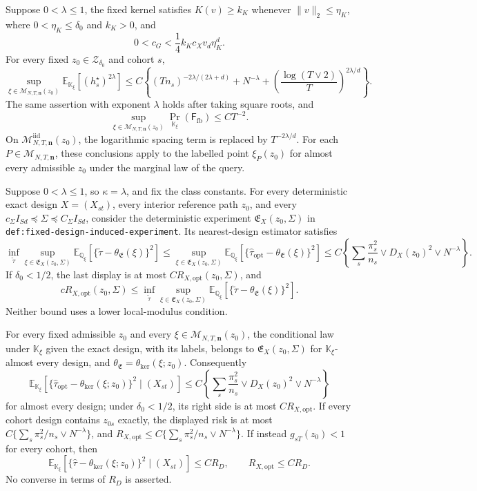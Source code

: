 Suppose \(0<\lambda\le1\), the fixed kernel satisfies
\(K(v)\ge k_K\) whenever \(\|v\|_2\le\eta_K\), where
\(0<\eta_K\le\delta_0\) and \(k_K>0\), and
\[
 0<c_G<\frac14 k_Kc_Xv_d\eta_K^d.
\]
For every fixed \(z_0\in\mathcal Z_{\delta_0}\) and cohort \(s\),
\[
 \sup_{\xi\in\mathcal M_{N,T,\mathbf n}(z_0)}
 \mathbb E_{\mathbb K_\xi}[(h_s^\star)^{2\lambda}]
 \le C\left\{(Tn_s)^{-2\lambda/(2\lambda+d)}+N^{-\lambda}
 +\left(\frac{\log(T\vee2)}{T}\right)^{2\lambda/d}\right\}.
\]
The same assertion with exponent \(\lambda\) holds after taking square
roots, and
\[
 \sup_{\xi\in\mathcal M_{N,T,\mathbf n}(z_0)}
 \Pr_{\mathbb K_\xi}(\mathsf F_{\mathrm{fb}})\le CT^{-2}.
\]
On \(\mathcal M^{\mathrm{iid}}_{N,T,\mathbf n}(z_0)\), the logarithmic
spacing term is replaced by \(T^{-2\lambda/d}\).  For each
\(P\in\mathcal M_{N,T,\mathbf n}\), these conclusions apply to the labelled
point \(\xi_P(z_0)\) for almost every admissible \(z_0\) under the marginal
law of the query.

Suppose \(0<\lambda\le1\), so \(\kappa=\lambda\), and fix the class
constants.  For every deterministic exact design \(X=(X_{st})\), every
interior reference path \(z_0\), and every
\(c_\Sigma I_{Sd}\preceq\Sigma\preceq C_\Sigma I_{Sd}\), consider the
deterministic experiment \(\mathfrak E_X(z_0,\Sigma)\) in
\texttt{def:fixed-design-induced-experiment}.  Its nearest-design estimator
satisfies
\[
 \inf_{\widetilde\tau}\sup_{\xi\in\mathfrak E_X(z_0,\Sigma)}
 \mathbb E_{\mathbb Q_\xi}
 \left[\{\widetilde\tau-\theta_{\mathfrak E}(\xi)\}^2\right]
 \le
 \sup_{\xi\in\mathfrak E_X(z_0,\Sigma)}
 \mathbb E_{\mathbb Q_\xi}
 \left[\{\widehat\tau_{\mathrm{opt}}-\theta_{\mathfrak E}(\xi)\}^2\right]
 \le C\left\{\sum_s\frac{\pi_s^2}{n_s}
          \vee D_X(z_0)^2\vee N^{-\lambda}\right\}.
\]
If \(\delta_0<1/2\), the last display is at most
\(CR_{X,\mathrm{opt}}(z_0,\Sigma)\), and
\[
 cR_{X,\mathrm{opt}}(z_0,\Sigma)
 \le
 \inf_{\widetilde\tau}\sup_{\xi\in\mathfrak E_X(z_0,\Sigma)}
 \mathbb E_{\mathbb Q_\xi}
 \left[\{\widetilde\tau-\theta_{\mathfrak E}(\xi)\}^2\right].
\]
Neither bound uses a lower local-modulus condition.

For every fixed admissible \(z_0\) and every
\(\xi\in\mathcal M_{N,T,\mathbf n}(z_0)\), the conditional law under
\(\mathbb K_\xi\) given the exact design, with its labels, belongs to
\(\mathfrak E_X(z_0,\Sigma)\) for \(\mathbb K_\xi\)-almost every design,
and \(\theta_{\mathfrak E}=\theta_{\mathrm{ker}}(\xi;z_0)\).  Consequently
\[
 \mathbb E_{\mathbb K_\xi}
 \left[\{\widehat\tau_{\mathrm{opt}}
 -\theta_{\mathrm{ker}}(\xi;z_0)\}^2\mid(X_{st})\right]
 \le C\left\{\sum_s\frac{\pi_s^2}{n_s}
          \vee D_X(z_0)^2\vee N^{-\lambda}\right\}
\]
for almost every design; under \(\delta_0<1/2\), its right side is at most
\(CR_{X,\mathrm{opt}}\).  If every cohort design contains \(z_{0s}\)
exactly, the displayed risk is at most
\(C\{\sum_s\pi_s^2/n_s\vee N^{-\lambda}\}\), and
\(R_{X,\mathrm{opt}}\le C\{\sum_s\pi_s^2/n_s\vee N^{-\lambda}\}\).
If instead \(g_{sT}(z_0)<1\) for every cohort, then
\[
 \mathbb E_{\mathbb K_\xi}
 \left[\{\widehat\tau-\theta_{\mathrm{ker}}(\xi;z_0)\}^2
 \mid(X_{st})\right]\le CR_D,
 \qquad R_{X,\mathrm{opt}}\le CR_D.
\]
No converse in terms of \(R_D\) is asserted.

